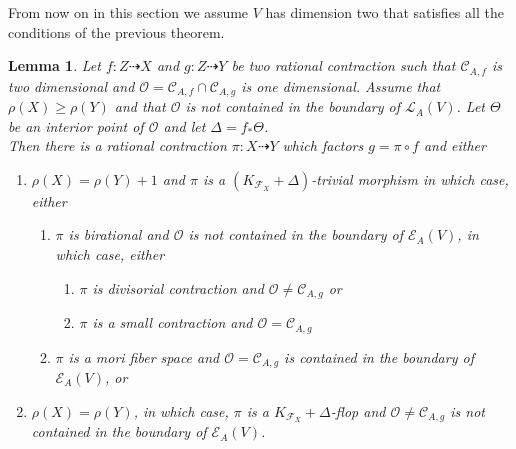 \documentclass[12pt]{amsart}%
\theoremstyle{plain}
\newtheorem{lemma}[theorem]{Lemma}
\theoremstyle{remark}
\theoremstyle{definition}
\newcommand{\<}{\leq}
\theoremstyle{definition}
\theoremstyle{definition}
\numberwithin{equation}{section}
\theoremstyle{remark}
\begin{document}
From now on in this section we assume $V$ has dimension two that satisfies all the conditions of the previous theorem.
\begin{lemma}\label{LSM2}
    Let $f:Z\dashrightarrow X$ and $g:Z\dashrightarrow Y$ be two rational contraction such that $\mathcal{C}_{A,f}$ is two dimensional and $\mathcal{O}=\mathcal{C}_{A,f}\cap\mathcal{C}_{A,g}$ is one dimensional. Assume that $\rho(X)\geqslant \rho(Y)$ and that $\mathcal{O}$ is not contained in the boundary of $\mathcal{L}_A(V)$. Let $\Theta$ be an interior point of $\mathcal{O}$ and let $\Delta=f_*\Theta$.\\
    Then there is a rational contraction $\pi:X\dashrightarrow Y$ which factors $g=\pi\circ f$ and either 
    \begin{enumerate}
        \item $\rho(X)=\rho(Y)+1$ and $\pi$ is a $(K_{\mathcal{F}_X}+\Delta)$-trivial morphism in which case, either 
        \begin{enumerate}
            \item $\pi$ is birational and $\mathcal{O}$ is not contained in the boundary of $\mathcal{E}_A(V)$, in which case, either
            \begin{enumerate}
                \item $\pi$ is divisorial contraction and $\mathcal{O}\neq \mathcal{C}_{A,g}$ or
                \item $\pi$ is a small contraction and $\mathcal{O}=\mathcal{C}_{A,g}$
            \end{enumerate}
            \item $\pi$ is a mori fiber space and $\mathcal{O}=\mathcal{C}_{A,g}$ is contained in the boundary of $\mathcal{E}_A(V)$, or
        \end{enumerate}
        \item $\rho(X)=\rho(Y)$, in which case, $\pi$ is a $K_{\mathcal{F}_X}+\Delta$-flop and $\mathcal{O}\neq \mathcal{C}_{A,g}$ is not contained in the boundary of $\mathcal{E}_A(V)$.
    \end{enumerate}
\end{lemma}
\end{document}
